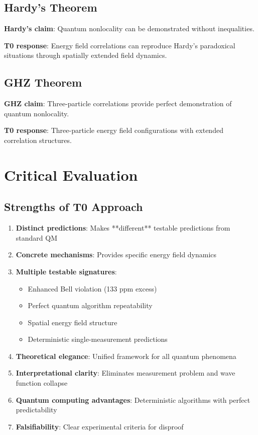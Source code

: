 \documentclass[12pt,a4paper]{article}
\begin{document}
	\subsection{Hardy's Theorem}
	
	\textbf{Hardy's claim}: Quantum nonlocality can be demonstrated without inequalities.
	
	\textbf{T0 response}: Energy field correlations can reproduce Hardy's paradoxical situations through spatially extended field dynamics.
	
	\subsection{GHZ Theorem}
	
	\textbf{GHZ claim}: Three-particle correlations provide perfect demonstration of quantum nonlocality.
	
	\textbf{T0 response}: Three-particle energy field configurations with extended correlation structures.
	
	\section{Critical Evaluation}
	
	\subsection{Strengths of T0 Approach}
	
	\begin{enumerate}
		\item \textbf{Distinct predictions}: Makes **different** testable predictions from standard QM
		\item \textbf{Concrete mechanisms}: Provides specific energy field dynamics
		\item \textbf{Multiple testable signatures}: 
		\begin{itemize}
			\item Enhanced Bell violation (133 ppm excess)
			\item Perfect quantum algorithm repeatability  
			\item Spatial energy field structure
			\item Deterministic single-measurement predictions
		\end{itemize}
		\item \textbf{Theoretical elegance}: Unified framework for all quantum phenomena
		\item \textbf{Interpretational clarity}: Eliminates measurement problem and wave function collapse
		\item \textbf{Quantum computing advantages}: Deterministic algorithms with perfect predictability
		\item \textbf{Falsifiability}: Clear experimental criteria for disproof
	\end{enumerate}
	
\end{document}
